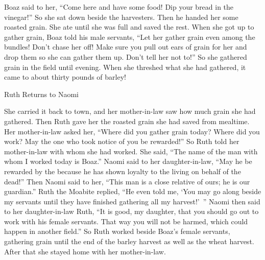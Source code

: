 {Boaz
said
to her, “Come
here
and have some food! Dip
your bread
in the vinegar!” So she sat down
beside
the harvesters.
Then he handed her some
roasted grain.
She ate
until she was full
and saved the rest.
When she got
up to gather
grain, Boaz
told
his male servants,
“Let her gather grain
even
among
the bundles! Don’t chase her
off!
Make sure you pull out
ears of grain
for her and drop
them so she can gather
them up.
Don’t tell
her not to!”
So she gathered
grain in the field
until
evening.
When she threshed
what she had
gathered,
it came to about thirty pounds
of barley!
\par }{\SH Ruth Returns to Naomi
\par }{\PP {}She carried
it back
to town,
and her mother-in-law
saw
how much grain she had
gathered.
Then Ruth
gave
her the roasted grain she had
saved
from mealtime.
Her mother-in-law
asked
her, “Where
did you gather
grain today? Where
did
you work? May the one who took notice of you be
rewarded!” So Ruth
told
her mother-in-law
with
whom
she had worked.
She said,
“The name
of the man
with
whom
I worked
today
is Boaz.”
Naomi
said
to her daughter-in-law,
“May he be rewarded
by the
{}
because
he has
shown
loyalty
to the living
on behalf
of the dead!” Then Naomi
said
to her, “This man
is
a close relative
of ours; he is
our guardian.”
Ruth
the Moabite
replied,
“He even
told
me,
‘You may
go along beside
my servants
until
they have
finished
gathering
all
my harvest!’ ”
Naomi
then said
to
her daughter-in-law
Ruth,
“It is good,
my daughter,
that
you should go out
to work with
his female
servants. That way you will not
be harmed,
which could happen in another
field.”
So Ruth worked beside Boaz’s
female servants,
gathering
grain until
the end
of the barley
harvest
as well as the wheat
harvest.
After that she stayed
home with
her mother-in-law.

}
